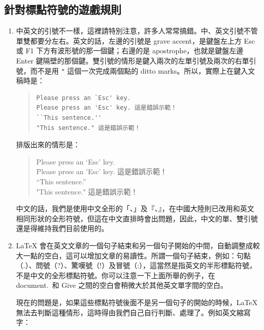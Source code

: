 \subsection{針對標點符號的遊戲規則}

\begin{enumerate}

   \item 中英文的引號不一樣，這裡請特別注意，許多人常常搞錯。中、英文引號不管單雙都要分左右。英文的話，左邊的引號是 grave accent，是鍵盤左上方 {\sffamily Esc} 或 {\sffamily F1} 下方有波形號的那一個鍵；右邊的是 apostrophe，也就是鍵盤左邊 {\sffamily Enter} 鍵隔壁的那個鍵。雙引號的情形是鍵入兩次的左單引號及兩次的右單引號，而不是用 \verb|"| 這個一次完成兩個點的 ditto marks。所以，實際上在鍵入文稿時是：

         \begin{quote}
            \begin{verbatim}
Please press an `Esc' key.
Please press an 'Esc' key. 這是錯誤示範！
``This sentence.''
"This sentence." 這是錯誤示範！
\end{verbatim}
         \end{quote}

         排版出來的情形是：

         \begin{quote}
            Please press an `Esc' key.\\
            Please press an 'Esc' key. 這是錯誤示範！\\
            ``This sentence.''\\
            "This sentence." 這是錯誤示範！
         \end{quote}

         中文的話，我們是使用中文全形的「、」及『、』，在中國大陸則已改用和英文相同形狀的全形符號，但這在中文直排時會出問題，因此，中文的單、雙引號還是得維持我們目前使用的。

   \item \LaTeX{} 會在英文文章的一個句子結束和另一個句子開始的中間，自動調整成較大一點的空白，這可以增加文章的易讀性。所謂一個句子結束，例如：句點（.）、問號（?）、驚嘆號（!）及冒號（:），這當然是指英文的半形標點符號，不是中文的全形標點符號。你可以注意一下上面所舉的例子，在 document.\ 和 Give 之間的空白會稍微大於其他英文單字間的空白。

         現在的問題是，如果這些標點符號後面不是另一個句子的開始的時候，\LaTeX{} 無法去判斷這種情形，這時得由我們自己自行判斷、處理了。例如英文縮寫字：


\end{enumerate}
